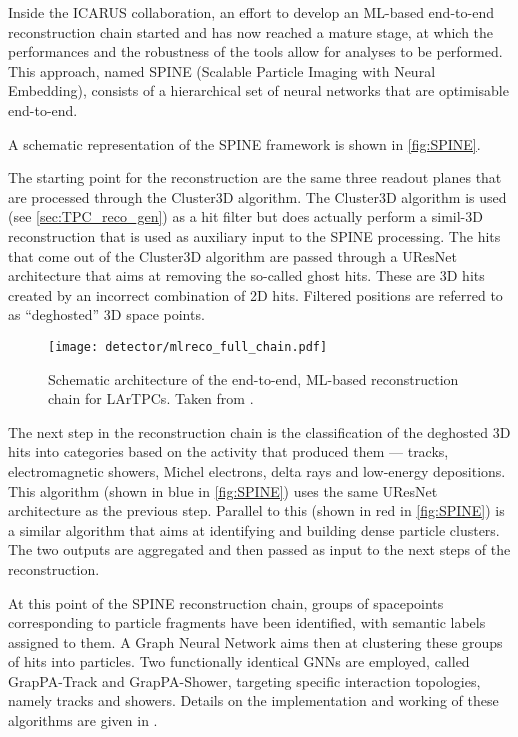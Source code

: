 Inside the ICARUS collaboration, an effort to develop an ML-based end-to-end reconstruction chain started and has now reached a mature stage, at which the performances and the robustness of the tools allow for analyses to be performed. This approach, named SPINE (Scalable Particle Imaging with Neural Embedding), consists of a hierarchical set of neural networks that are optimisable end-to-end. 

A schematic representation of the SPINE framework is shown in \autoref{fig:SPINE}. 

The starting point for the reconstruction are the same three readout planes that are processed through the Cluster3D algorithm. The Cluster3D algorithm is used (see \autoref{sec:TPC_reco_gen}) as a hit filter but does actually perform a simil-3D reconstruction that is used as auxiliary input to the SPINE processing. The hits that come out of the Cluster3D algorithm are passed through a UResNet architecture that aims at removing the so-called ghost hits. These are 3D hits created by an incorrect combination of 2D hits. Filtered positions are referred to as ``deghosted'' 3D space points. 

\begin{figure}
    \centering
    \texttt{[image: detector/mlreco\_full\_chain.pdf]}
    \caption[SPINE end-to-end machine learning approach]{Schematic architecture of the end-to-end, ML-based reconstruction chain for LArTPCs. Taken from \cite{Drielsma:2021jdv}. }
    \label{fig:SPINE}
\end{figure}

The next step in the reconstruction chain is the classification of the deghosted 3D hits into categories based on the activity that produced them --- tracks, electromagnetic showers, Michel electrons, delta rays and low-energy depositions. This algorithm (shown in blue in \autoref{fig:SPINE}) uses the same UResNet architecture as the previous step. Parallel to this (shown in red in \autoref{fig:SPINE}) is a similar algorithm that aims at identifying and building dense particle clusters. The two outputs are aggregated and then passed as input to the next steps of the reconstruction. 


At this point of the SPINE reconstruction chain, groups of spacepoints corresponding to particle fragments have been identified, with semantic labels assigned to them. A Graph Neural Network aims then at clustering these groups of hits into particles. Two functionally identical GNNs are employed, called GrapPA-Track and GrapPA-Shower, targeting specific interaction topologies, namely tracks and showers. Details on the implementation and working of these algorithms are given in \cite{Drielsma:2021jdv}. 

